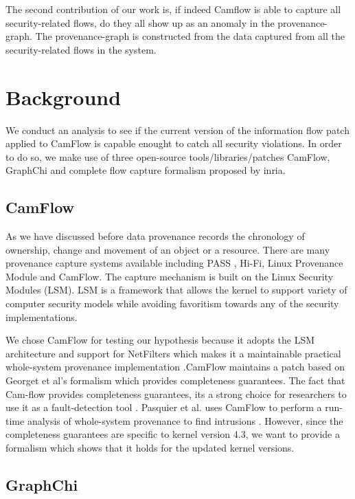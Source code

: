 \documentclass{IEEEtran}
\begin{document}
The second contribution of our work is, if indeed Camflow \cite{b7}  is able to capture all security-related flows, do they all show up as an anomaly in the provenance-graph. The provenance-graph is constructed from the data captured from all the security-related flows in the system. 


\section{Background}
We conduct an analysis to see if the current version of the information flow patch applied to CamFlow is capable enought to catch all security violations. In order to do so, we make use of three open-source tools/libraries/patches CamFlow, GraphChi and complete flow capture formalism proposed by inria. 

\subsection{CamFlow} 

As we have discussed before data provenance records the chronology of  ownership, change and movement of an object or a resource. There are many provenance capture systems available including PASS \cite{b10}, Hi-Fi\cite{b11}, Linux Provenance Module \cite{b12} and CamFlow\cite{b9}. The capture mechanism is built on the Linux Security Modules (LSM). LSM is a framework that allows the kernel to support variety of computer security models while avoiding favoritism towards any of the security implementations. 

We chose CamFlow for testing our hypothesis because it adopts the LSM architecture and support for NetFilters which makes it a maintainable practical whole-system provenance implementation .CamFlow maintains a patch based on Georget et al's \cite{b3}formalism which provides completeness guarantees. The fact that Cam-flow provides completeness guarantees, its a strong choice for researchers to use it as a fault-detection tool \cite{b8}. Pasquier et al. uses CamFlow to perform a run-time analysis of whole-system provenance to find intrusions \cite{b6}. However, since the completeness guarantees are specific to kernel version 4.3, we want to provide a formalism which shows that it holds for the updated kernel versions. 

\subsection{GraphChi}
\end{document}
